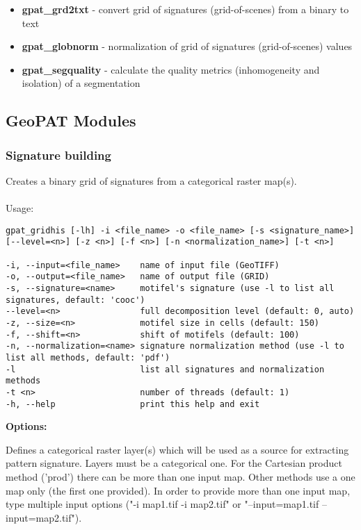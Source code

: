 \begin{itemize}
  \item \textbf{gpat\_grd2txt} - convert grid of signatures (grid-of-scenes) from a binary to text
  \item \textbf{gpat\_globnorm} - normalization of grid of signatures (grid-of-scenes) values
  \item \textbf{gpat\_segquality} - calculate the quality metrics (inhomogeneity and isolation) of a segmentation
\end{itemize}

\subsection{GeoPAT Modules}

\subsubsection{Signature building}

Creates a binary grid of signatures from a categorical raster map(s).
\\\\
Usage:

\begin{minipage}{\linewidth}
\begin{lstlisting}
gpat_gridhis [-lh] -i <file_name> -o <file_name> [-s <signature_name>] [--level=<n>] [-z <n>] [-f <n>] [-n <normalization_name>] [-t <n>]

-i, --input=<file_name>    name of input file (GeoTIFF)
-o, --output=<file_name>   name of output file (GRID)
-s, --signature=<name>     motifel's signature (use -l to list all signatures, default: 'cooc')
--level=<n>                full decomposition level (default: 0, auto)
-z, --size=<n>             motifel size in cells (default: 150)
-f, --shift=<n>            shift of motifels (default: 100)
-n, --normalization=<name> signature normalization method (use -l to list all methods, default: 'pdf')
-l                         list all signatures and normalization methods
-t <n>                     number of threads (default: 1)
-h, --help                 print this help and exit
\end{lstlisting}
\end{minipage}

{\bf Options:}


Defines a categorical raster layer(s) which will be used as a source for extracting pattern signature.
Layers must be a categorical one. For the Cartesian product method ('prod') there can be more than one input map.
Other methods use a one map only (the first one provided). 
In order to provide more than one input map, type multiple input options ("-i map1.tif -i map2.tif" or "--input=map1.tif --input=map2.tif").

